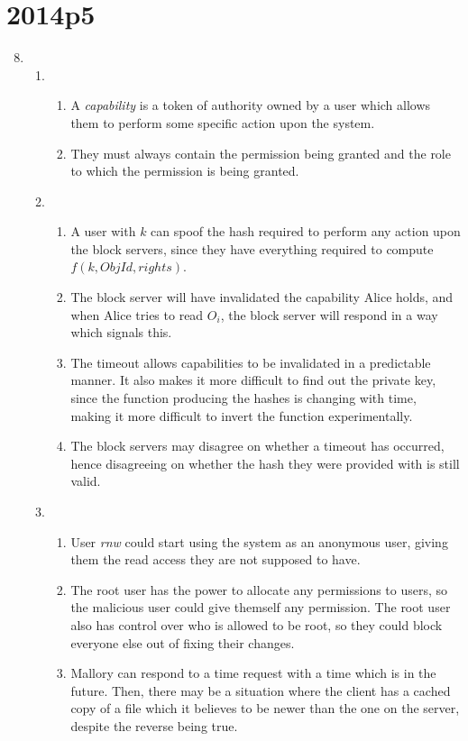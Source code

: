 \documentclass{article}
\begin{document}
\section{2014p5}

\begin{enumerate}
    \setcounter{enumi}{7}
  \item
    \begin{enumerate}
      \item
        \begin{enumerate}
          \item A \textit{capability} is a token of authority owned by a user which allows them to perform some specific action upon the system.
          \item They must always contain the permission being granted and the role to which the permission is being granted.
        \end{enumerate}
      \item
        \begin{enumerate}
          \item A user with $k$ can spoof the hash required to perform any action upon the block servers, since they have everything required to compute $f(k,\mathit{ObjId},\mathit{rights})$.
          \item The block server will have invalidated the capability Alice holds, and when Alice tries to read $O_i$, the block server will respond in a way which signals this.
          \item The timeout allows capabilities to be invalidated in a predictable manner. It also makes it more difficult to find out the private key, since the function producing the hashes is changing with time, making it more difficult to invert the function experimentally.
          \item The block servers may disagree on whether a timeout has occurred, hence disagreeing on whether the hash they were provided with is still valid.
        \end{enumerate}
      \item
        \begin{enumerate}
          \item User \textit{rnw} could start using the system as an anonymous user, giving them the read access they are not supposed to have.
          \item The root user has the power to allocate any permissions to users, so the malicious user could give themself any permission. The root user also has control over who is allowed to be root, so they could block everyone else out of fixing their changes.
          \item Mallory can respond to a time request with a time which is in the future. Then, there may be a situation where the client has a cached copy of a file which it believes to be newer than the one on the server, despite the reverse being true.
        \end{enumerate}
    \end{enumerate}
\end{enumerate}
\end{document}
